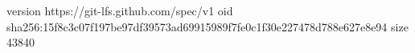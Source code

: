 version https://git-lfs.github.com/spec/v1
oid sha256:15f8c3c07f197be97df39573ad69915989f7fe0c1f30e227478d788e627e8e94
size 43840
